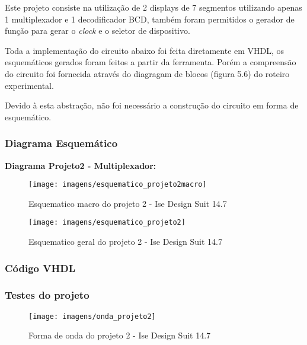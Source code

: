\documentclass[12pts]{article}
\begin{document}
	Este projeto consiste na utilização de 2 displays de 7 segmentos utilizando apenas 1 multiplexador e 1 decodificador BCD, também foram permitidos o gerador de função para gerar o \textit{clock} e o seletor de dispositivo.
	
	Toda a implementação do circuito abaixo foi feita diretamente em VHDL, os esquemáticos gerados foram feitos a partir da ferramenta. Porém a compreensão do circuito foi fornecida através do diagragam de blocos (figura 5.6) do roteiro experimental.
	
	Devido à esta abstração, não foi necessário a construção do circuito em forma de esquemático.

\subsubsection{Diagrama Esquemático}

\textbf{Diagrama Projeto2 - Multiplexador:}

\begin{figure}[!htb]
  \centering
  \texttt{[image: imagens/esquematico\_projeto2macro]}
  \caption{Esquematico macro do projeto 2 - Ise Design Suit 14.7}
  \label{figRotulo}
\end{figure}

\clearpage

\begin{figure}[!htb]
  \centering
  \texttt{[image: imagens/esquematico\_projeto2]}
  \caption{Esquematico geral do projeto 2 - Ise Design Suit 14.7}
  \label{figRotulo}
\end{figure}


\clearpage
\subsubsection{Código VHDL}



\clearpage
\subsubsection{Testes do projeto}

\begin{figure}[!htb]
  \centering
  \texttt{[image: imagens/onda\_projeto2]}
  \caption{Forma de onda do projeto 2 - Ise Design Suit 14.7}
  \label{figRotulo}
\end{figure}
\fi
\end{document}
